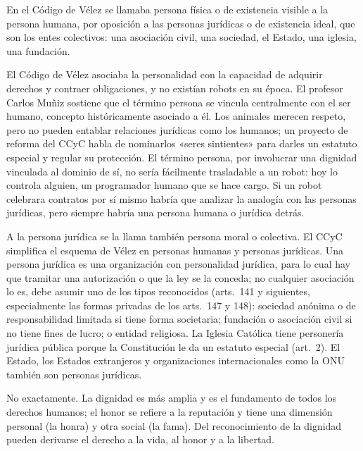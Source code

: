 \documentclass[12pt,oneside]{book}
\begin{document}
\begin{description}[leftmargin=0pt,style=unboxed]
\item[Persona física y persona no física.] En el Código de Vélez se llamaba persona física o de existencia visible a la persona humana, por oposición a las personas jurídicas o de existencia ideal, que son los entes colectivos: una asociación civil, una sociedad, el Estado, una iglesia, una fundación.
\item[¿Puede un robot ser persona?] El Código de Vélez asociaba la personalidad con la capacidad de adquirir derechos y contraer obligaciones, y no existían robots en su época. El profesor Carlos Muñiz sostiene que el término persona se vincula centralmente con el ser humano, concepto históricamente asociado a él. Los animales merecen respeto, pero no pueden entablar relaciones jurídicas como los humanos; un proyecto de reforma del CCyC habla de nominarlos «seres sintientes» para darles un estatuto especial y regular su protección. El término persona, por involucrar una dignidad vinculada al dominio de sí, no sería fácilmente trasladable a un robot: hoy lo controla alguien, un programador humano que se hace cargo. Si un robot celebrara contratos por sí mismo habría que analizar la analogía con las personas jurídicas, pero siempre habría una persona humana o jurídica detrás.
\item[Persona jurídica y persona moral.] A la persona jurídica se la llama también persona moral o colectiva. El CCyC simplifica el esquema de Vélez en personas humanas y personas jurídicas. Una persona jurídica es una organización con personalidad jurídica, para lo cual hay que tramitar una autorización o que la ley se la conceda; no cualquier asociación lo es, debe asumir uno de los tipos reconocidos (arts.~141 y siguientes, especialmente las formas privadas de los arts.~147 y 148): sociedad anónima o de responsabilidad limitada si tiene forma societaria; fundación o asociación civil si no tiene fines de lucro; o entidad religiosa. La Iglesia Católica tiene personería jurídica pública porque la Constitución le da un estatuto especial (art.~2). El Estado, los Estados extranjeros y organizaciones internacionales como la ONU también son personas jurídicas.
\item[¿Son lo mismo honor y dignidad?] No exactamente. La dignidad es más amplia y es el fundamento de todos los derechos humanos; el honor se refiere a la reputación y tiene una dimensión personal (la honra) y otra social (la fama). Del reconocimiento de la dignidad pueden derivarse el derecho a la vida, al honor y a la libertad.
\end{description}
\end{document}
